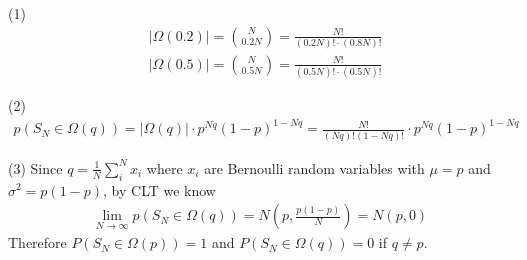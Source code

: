 \documentclass[12pt]{article}
\newenvironment{problem}[2][Problem]{\begin{trivlist}
\item[\hskip \labelsep {\bfseries #1}\hskip \labelsep {\bfseries #2}]}{\end{trivlist}}
\begin{document}
\begin{problem}{3.}
\item{(1)}
\begin{align*}
	&|\Omega(0.2)| = {{N}\choose{0.2N}} = \frac{N!}{(0.2N)!\cdot(0.8N)!}\\
	&|\Omega(0.5)| = {{N}\choose{0.5N}} = \frac{N!}{(0.5N)!\cdot(0.5N)!}
\end{align*}
\item{(2)}
\begin{align*}
	p(S_N \in \Omega(q)) = |\Omega(q)| \cdot p^{Nq} (1-p)^{1-Nq} = 
	\frac{N!}{(Nq)!(1-Nq)!} \cdot p^{Nq} (1-p)^{1-Nq}
\end{align*}
\item{(3)}
Since $q = \frac{1}{N}\sum_i^N x_i$ where $x_i$ are Bernoulli random variables with $\mu = p$ and $\sigma^2 = p(1-p)$, by CLT we know 
\begin{align*}
	\lim_{N\to\infty} p(S_N \in \Omega(q)) = N(p, \frac{p(1-p)}{N}) = N(p, 0)
\end{align*}
Therefore $P(S_N \in \Omega(p)) = 1$ and $P(S_N \in \Omega(q)) = 0$ if $q \neq p$.
\end{problem}

 
\end{document}
